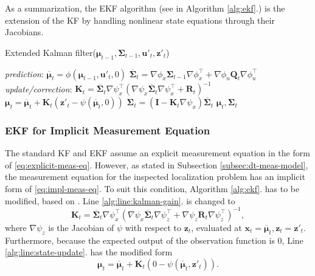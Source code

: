 As a summarization, the EKF algorithm (see in Algorithm \ref{alg:ekf}.) is the extension of the KF by handling nonlinear state equations through their Jacobians.

\begin{algorithm}
    \caption{Extended Kalman filter($\boldsymbol{\mu}_{t-1},\mathbf{\Sigma}_{t-1},\mathbf{u}'_t,\mathbf{z}'_t$)}\label{alg:ekf}
    \begin{algorithmic}[1]
        \BState \emph{prediction}:
        \State\indent$\overline{\boldsymbol{\mu}}_t = \phi(\boldsymbol{\mu}_{t-1},\mathbf{u}'_t,0)$
        \State\indent $\overline{\mathbf{\Sigma}}_t = \nabla \phi_x\mathbf{\Sigma}_{t-1}\nabla \phi_x^{\top} +
            \nabla \phi _u\mathbf{Q}_t \nabla \phi_u^{\top}$
        \BState \emph{update/correction}:
        \State\indent $\mathbf{K}_t = \overline{\mathbf{\Sigma}}_t\nabla \psi_x^\top\left(\nabla \psi_x\overline{\mathbf{\Sigma}}_t\nabla \psi_x^\top+\mathbf{R}_t\right)^{-1}$ \label{alg:line:kalman-gain}
        \State\indent $\boldsymbol{\mu}_t = \overline{\boldsymbol{\mu}}_t + \mathbf{K}_t\left(\mathbf{z}'_t-\psi(\overline{\boldsymbol{\mu}}_t,0)\right)$ \label{alg:line:state-update}
        \State\indent $\mathbf{\Sigma}_t = \left(\mathbf{I}-\mathbf{K}_t\nabla \psi_x\right)\overline{\mathbf{\Sigma}}_t$
        \State\Return $\boldsymbol{\mu}_t,\mathbf{\Sigma}_t$
    \end{algorithmic}
\end{algorithm}

\subsubsection{EKF for Implicit Measurement Equation}

The standard KF and EKF assume an explicit measurement equation in the form of \eqref{eq:explicit-meas-eq}.
However, as stated in Subsection \ref{subsec:dt-meas-model}, the measurement equation for the inspected
localization problem has an implicit form of \eqref{eq:impl-meas-eq}.
To suit this condition, Algorithm \ref{alg:ekf}. has to be modified, based on \cite{Steffen2013,Zhang2012}.
Line \ref{alg:line:kalman-gain}. is changed to
\begin{equation}
    \mathbf{K}_t = \overline{\mathbf{\Sigma}}_t\nabla \psi_x^\top\left(\nabla \psi_x\overline{\mathbf{\Sigma}}_t\nabla \psi_z^\top+
    \nabla \psi_z\mathbf{R}_t\nabla \psi^{\top}_z\right)^{-1},
\end{equation}
where $\nabla \psi_z$ is the Jacobian of $\psi$ with respect to $\mathbf{z}_t$, evaluated at
$\mathbf{x}_t = \overline{\boldsymbol{\mu}}_t, \mathbf{z}_t = \mathbf{z}'_t$.
Furthermore, because the expected output of the observation function is 0, Line \ref{alg:line:state-update}. has the modified form
\begin{equation}
    \boldsymbol{\mu}_t = \overline{\boldsymbol{\mu}}_t + \mathbf{K}_t\left(0-\psi(\overline{\boldsymbol{\mu}}_t,\mathbf{z}'_t)\right).
\end{equation}
